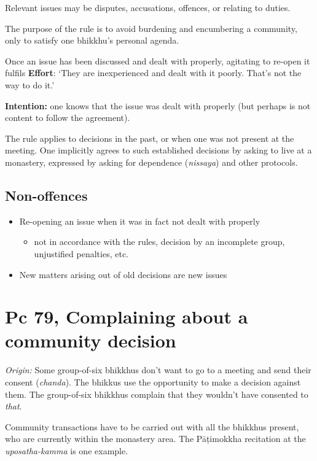 Relevant issues may be disputes, accusations, offences, or relating to
duties.

The purpose of the rule is to avoid burdening and encumbering a
community, only to satisfy one bhikkhu's personal agenda.

Once an issue has been discussed and dealt with properly, agitating to
re-open it fulfils \textbf{Effort}: `They are inexperienced and dealt
with it poorly. That's not the way to do it.'

\textbf{Intention:} one knows that the issue was dealt with properly
(but perhaps is not content to follow the agreement).

The rule applies to decisions in the past, or when one was not present
at the meeting. One implicitly agrees to such established decisions by
asking to live at a monastery, expressed by asking for dependence
(\emph{nissaya}) and other protocols.

\subsection{Non-offences}

\begin{itemize}
\tightlist
\item
  Re-opening an issue when it was in fact not dealt with properly

  \begin{itemize}
  \tightlist
  \item
    not in accordance with the rules, decision by an incomplete group,
    unjustified penalties, etc.
  \end{itemize}
\item
  New matters arising out of old decisions are new issues
\end{itemize}

\section{Pc 79, Complaining about a community decision}

\emph{Origin:} Some group-of-six bhikkhus don't want to go to a meeting
and send their consent (\emph{chanda}). The bhikkus use the opportunity
to make a decision against them. The group-of-six bhikkhus complain that
they wouldn't have consented to \emph{that}.

Community transactions have to be carried out with all the bhikkhus
present, who are currently within the monastery area. The Pāṭimokkha
recitation at the \emph{uposatha-kamma} is one example.

